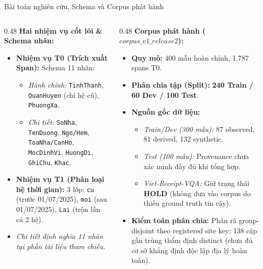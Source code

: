 \documentclass[aspectratio=169, 9pt]{beamer}
\begin{document}
\begin{frame}{Bài toán nghiên cứu, Schema và Corpus phát hành}
  \vspace{-0.15cm}
  {\fontsize{8.2pt}{10.5pt}\selectfont
  \begin{columns}[T]
    \begin{column}{0.48\textwidth}
      \textbf{Hai nhiệm vụ cốt lõi \& Schema nhãn:}
      \begin{itemize}
        \setlength{\itemsep}{3pt}
        \item \textbf{Nhiệm vụ T0 (Trích xuất Span):} Schema 11 nhãn:
        \begin{itemize}
          \setlength{\itemsep}{1.5pt}
          \item \textit{Hành chính:} \texttt{TinhThanh}, \texttt{QuanHuyen} (chỉ hệ cũ), \texttt{PhuongXa}.
          \item \textit{Chi tiết:} \texttt{SoNha}, \texttt{TenDuong}, \texttt{Ngo/Hem}, \texttt{ToaNha/CanHo}, \texttt{MocDinhVi}, \texttt{HuongDi}, \texttt{GhiChu}, \texttt{Khac}.
        \end{itemize}
        \item \textbf{Nhiệm vụ T1 (Phân loại hệ thời gian):} 3 lớp: \texttt{cu} (trước 01/07/2025), \texttt{moi} (sau 01/07/2025), \texttt{Lai} (trộn lẫn cả 2 hệ).
        \item \textit{Chi tiết định nghĩa 11 nhãn tại phần tài liệu tham chiếu.}
      \end{itemize}
    \end{column}
    \begin{column}{0.48\textwidth}
      \textbf{Corpus phát hành ($corpus\_v1\_release2$):}
      \begin{itemize}
        \setlength{\itemsep}{3pt}
        \item \textbf{Quy mô:} 400 mẫu hoàn chỉnh, 1.787 spans T0.
        \item \textbf{Phân chia tập (Split):} \textbf{240 Train / 60 Dev / 100 Test}.
        \item \textbf{Nguồn gốc dữ liệu:}
        \begin{itemize}
          \setlength{\itemsep}{1.5pt}
          \item \textit{Train/Dev (300 mẫu):} 87 observed, 81 derived, 132 synthetic.
          \item \textit{Test (100 mẫu):} Provenance chưa xác minh đầy đủ khi tổng hợp.
          \item \textit{Viet-Receipt-VQA:} Giữ trạng thái \textbf{HOLD} (không đưa vào corpus do thiếu ground truth tin cậy).
        \end{itemize}
        \item \textbf{Kiểm toán phân chia:} Phân rã group-disjoint theo registered site key; 138 cặp gần trùng thẩm định distinct (chưa đủ cơ sở khẳng định độc lập địa lý hoàn toàn).
      \end{itemize}
    \end{column}
  \end{columns}
  }
\end{frame}
\end{document}
